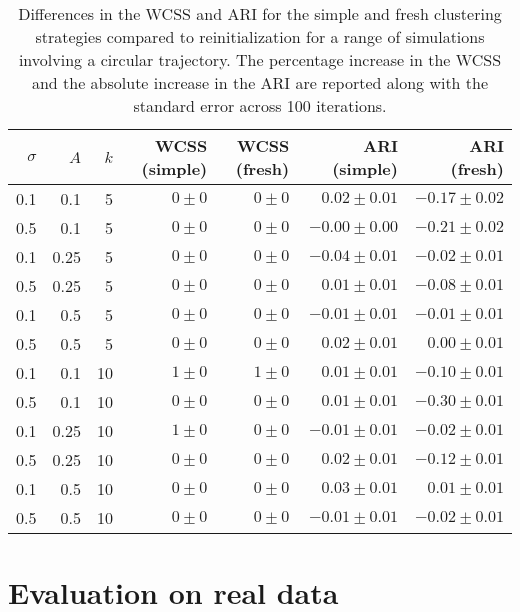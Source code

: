 \documentclass{article}
\begin{document}
\begin{table}
\caption{Differences in the WCSS and ARI for the simple and fresh clustering strategies compared to reinitialization for a range of simulations involving a circular trajectory.
The percentage increase in the WCSS and the absolute increase in the ARI are reported along with the standard error across 100 iterations.}
\label{tab:circular}
\begin{center}
\begin{tabular}{r r r r r r r}
\hline
$\sigma$ & $A$ & $k$ & WCSS (simple) & WCSS (fresh) & ARI (simple) & ARI (fresh) \\
\hline
0.1 & 0.1 & 5 & $0 \pm 0$ & $0 \pm 0$ & $0.02 \pm 0.01$ & $-0.17 \pm 0.02$ \\
0.5 & 0.1 & 5 & $0 \pm 0$ & $0 \pm 0$ & $-0.00 \pm 0.00$ & $-0.21 \pm 0.02$ \\
0.1 & 0.25 & 5 & $0 \pm 0$ & $0 \pm 0$ & $-0.04 \pm 0.01$ & $-0.02 \pm 0.01$ \\
0.5 & 0.25 & 5 & $0 \pm 0$ & $0 \pm 0$ & $0.01 \pm 0.01$ & $-0.08 \pm 0.01$ \\
0.1 & 0.5 & 5 & $0 \pm 0$ & $0 \pm 0$ & $-0.01 \pm 0.01$ & $-0.01 \pm 0.01$ \\
0.5 & 0.5 & 5 & $0 \pm 0$ & $0 \pm 0$ & $0.02 \pm 0.01$ & $0.00 \pm 0.01$ \\
0.1 & 0.1 & 10 & $1 \pm 0$ & $1 \pm 0$ & $0.01 \pm 0.01$ & $-0.10 \pm 0.01$ \\
0.5 & 0.1 & 10 & $0 \pm 0$ & $0 \pm 0$ & $0.01 \pm 0.01$ & $-0.30 \pm 0.01$ \\
0.1 & 0.25 & 10 & $1 \pm 0$ & $0 \pm 0$ & $-0.01 \pm 0.01$ & $-0.02 \pm 0.01$ \\
0.5 & 0.25 & 10 & $0 \pm 0$ & $0 \pm 0$ & $0.02 \pm 0.01$ & $-0.12 \pm 0.01$ \\
0.1 & 0.5 & 10 & $0 \pm 0$ & $0 \pm 0$ & $0.03 \pm 0.01$ & $0.01 \pm 0.01$ \\
0.5 & 0.5 & 10 & $0 \pm 0$ & $0 \pm 0$ & $-0.01 \pm 0.01$ & $-0.02 \pm 0.01$ \\
\hline
\end{tabular}
\end{center}
\end{table}

\section{Evaluation on real data}



\end{document}
